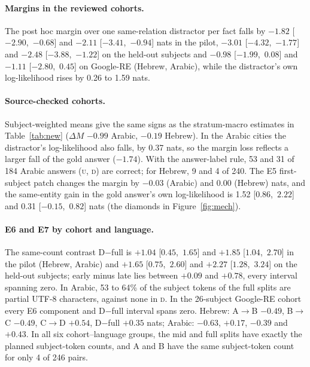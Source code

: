 \documentclass[11pt]{article}
\newcommand{\U}{\textsc{u}}
\newcommand{\D}{\textsc{d}}
\newcommand{\cA}{\textsf{A}}
\newcommand{\cB}{\textsf{B}}
\newcommand{\cC}{\textsf{C}}
\newcommand{\cD}{\textsf{D}}
\newcommand{\ci}[2]{\mbox{[$#1$, $#2$]}}
\begin{document}
\paragraph{Margins in the reviewed cohorts.} The post hoc margin over one
same-relation distractor per fact falls by $-1.82$ \ci{-2.90}{-0.68} and $-2.11$
\ci{-3.41}{-0.94} nats in the pilot, $-3.01$ \ci{-4.32}{-1.77} and $-2.48$
\ci{-3.88}{-1.22} on the held-out subjects and $-0.98$ \ci{-1.99}{0.08} and
$-1.11$ \ci{-2.80}{0.45} on Google-RE (Hebrew, Arabic), while the distractor's own
log-likelihood rises by 0.26 to 1.59 nats.

\paragraph{Source-checked cohorts.} Subject-weighted means give the same signs as
the stratum-macro estimates in Table~\ref{tab:new} ($\Delta M$ $-0.99$ Arabic,
$-0.19$ Hebrew). In the Arabic cities the distractor's log-likelihood also falls,
by 0.37 nats, so the margin loss reflects a larger fall of the gold answer
($-1.74$). With the answer-label rule, 53 and 31 of 184 Arabic answers (\U,
\D) are correct; for Hebrew, 9 and 4 of 240. The E5 first-subject patch changes
the margin by $-0.03$ (Arabic) and $0.00$ (Hebrew) nats, and the same-entity gain
in the gold answer's own log-likelihood is 1.52 \ci{0.86}{2.22} and 0.31
\ci{-0.15}{0.82} nats (the diamonds in Figure~\ref{fig:mech}).

\paragraph{E6 and E7 by cohort and language.} The same-count contrast \cD$-$\textsf{full} is
$+1.04$ \ci{0.45}{1.65} and $+1.85$ \ci{1.04}{2.70} in the pilot (Hebrew, Arabic)
and $+1.65$ \ci{0.75}{2.60} and $+2.27$ \ci{1.28}{3.24} on the held-out subjects;
early minus late lies between $+0.09$ and $+0.78$, every interval spanning zero.
In Arabic, 53 to 64\% of the subject tokens of the \textsf{full} splits are
partial UTF-8 characters, against none in \D.
In the 26-subject Google-RE cohort every E6 component and \cD$-$\textsf{full}
interval spans zero. Hebrew: \cA$\to$\cB{} $-0.49$, \cB$\to$\cC{} $-0.49$,
\cC$\to$\cD{} $+0.54$, \cD$-$\textsf{full} $+0.35$ nats; Arabic: $-0.63$, $+0.17$,
$-0.39$ and $+0.43$. In all six cohort--language groups, the \textsf{mid} and \textsf{full}
splits have exactly the planned subject-token counts, and \cA{} and \cB{} have the
same subject-token count for only 4 of 246 pairs.
\end{document}

